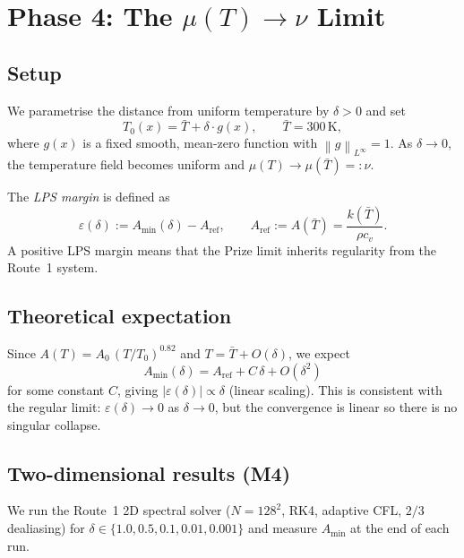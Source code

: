 \documentclass[12pt]{article}
\newcommand{\eps}{\varepsilon}
\newcommand{\norm}[1]{\left\|#1\right\|}
\newcommand{\Amin}{A_{\min}}
\begin{document}
\section{Phase 4: The $\mu(T)\to\nu$ Limit}
\label{sec:phase4}

\subsection{Setup}
\label{ssec:phase4-setup}

We parametrise the distance from uniform temperature by $\delta > 0$ and set
\begin{equation}
  \label{eq:T-initial-delta}
  T_0(x) = \bar{T} + \delta\cdot g(x),
  \qquad \bar{T} = 300\,\mathrm{K},
\end{equation}
where $g(x)$ is a fixed smooth, mean-zero function with $\norm{g}_{L^\infty} = 1$.
As $\delta\to 0$, the temperature field becomes uniform and $\mu(T)\to\mu(\bar{T})
=: \nu$.

The \emph{LPS margin} is defined as
\begin{equation}
  \label{eq:eps-delta}
  \eps(\delta) := A_{\min}(\delta) - A_{\mathrm{ref}},
  \qquad A_{\mathrm{ref}} := A(\bar{T}) = \frac{k(\bar{T})}{\rho c_v}.
\end{equation}
A positive LPS margin means that the Prize limit inherits regularity from the
Route~1 system.

\subsection{Theoretical expectation}
\label{ssec:phase4-theory}

Since $A(T) = A_0\,(T/T_0)^{0.82}$ and $T = \bar{T} + O(\delta)$, we expect
\[
  A_{\min}(\delta) = A_{\mathrm{ref}} + C\,\delta + O(\delta^2)
\]
for some constant $C$, giving $|\eps(\delta)| \propto \delta$ (linear scaling).
This is consistent with the regular limit: $\eps(\delta)\to 0$ as $\delta\to 0$,
but the convergence is linear so there is no singular collapse.

\subsection{Two-dimensional results (M4)}
\label{ssec:phase4-2D}

We run the Route~1 2D spectral solver ($N = 128^2$, RK4, adaptive CFL, $2/3$
dealiasing) for $\delta \in \{1.0, 0.5, 0.1, 0.01, 0.001\}$ and measure
$\Amin$ at the end of each run.
\end{document}
